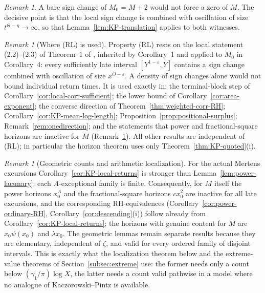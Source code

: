 \documentclass[11pt,reqno]{amsart}
\numberwithin{equation}{section}
\theoremstyle{plain}
\theoremstyle{definition}
\theoremstyle{remark}
\newtheorem{remark}[theorem]{Remark}
\begin{document}
\begin{remark}
A bare sign change of $M_0=M+2$ would not force a zero of $M$. The
decisive point is that the local sign change is combined with oscillation of
size $t^{\Theta-\eta}\to\infty$, so that Lemma~\ref{lem:KP-translation}
applies to both witnesses.
\end{remark}

\begin{remark}[Where (RL) is used]
\label{rem:RL-dependence}
Property (RL) rests on the local statement (2.2)--(2.3) of
Theorem~1 of \cite{KP86}, inherited by Corollary~1 and applied to $M_0$ in
Corollary~4: every sufficiently late interval $[Y^{1-\varepsilon},Y]$
contains a sign change combined with oscillation of size
$x^{\Theta-\varepsilon}$.  A density of sign changes alone would not bound
individual return times. It is used exactly in:
the terminal-block step of Corollary~\ref{cor:local-corr-sufficient}; the
lower bound of Corollary~\ref{cor:area-exponent}; the converse direction of
Theorem~\ref{thm:weighted-corr-RH}; Corollary~\ref{cor:KP-mean-log-length};
Proposition~\ref{prop:positional-surplus}; Remark~\ref{rem:onedirection};
and the statements that power and fractional-square horizons are inactive
for $M$ (Remark~\ref{rem:geom-vs-arith}). All other results are independent
of (RL); in particular the horizon theorem uses only
Theorem~\ref{thm:KP-quoted}(i).
\end{remark}

\begin{remark}[Geometric counts and arithmetic localization]
\label{rem:geom-vs-arith}
For the actual Mertens excursions Corollary~\ref{cor:KP-local-returns} is
stronger than Lemma~\ref{lem:power-lacunary}: each $A$-exceptional family is
finite. Consequently, for $M$ itself the power horizons $x_0^A$ and the
fractional-square horizons $cx_0^2$ are inactive for all late excursions,
and the corresponding RH-equivalences (Corollary~\ref{cor:power-ordinary-RH},
Corollary~\ref{cor:descending}(i)) follow already from
Corollary~\ref{cor:KP-local-returns}; the horizons with genuine content for
$M$ are $x_0\psi(x_0)$ and $\lambda x_0$. The geometric lemmas remain separate results because they are
elementary, independent of $\zeta$, and valid for every ordered family of
disjoint intervals. This is exactly what the localization theorem below and
the extreme-value theorems of Section~\ref{subsec:extreme} use: the former
needs only a count below $(\gamma_1/\pi)\log X$, the latter needs a count
valid pathwise in a model where no analogue of Kaczorowski--Pintz is
available.
\end{remark}
\end{document}
